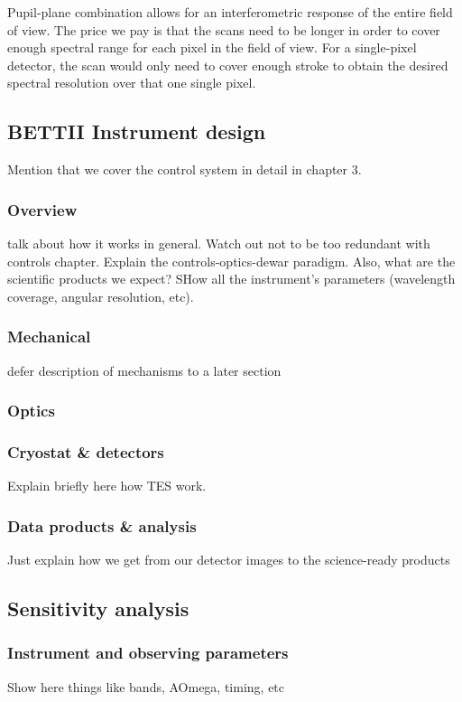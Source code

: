 Pupil-plane combination allows for an interferometric response of the entire field of view. The price we pay is that the \OPD scans need to be longer in order to cover enough spectral range for each pixel in the field of view. For a single-pixel detector, the \OPD scan would only need to cover enough stroke to obtain the desired spectral resolution over that one single pixel.


\subsection{BETTII Instrument design}

Mention that we cover the control system in detail in chapter 3.

\subsubsection{Overview}
talk about how it works in general. Watch out not to be too redundant with controls chapter. Explain the controls-optics-dewar paradigm. Also, what are the scientific products we expect? SHow all the instrument's parameters (wavelength coverage, angular resolution, etc).

\subsubsection{Mechanical}
defer description of mechanisms to a later section
\subsubsection{Optics}

\subsubsection{Cryostat \& detectors}

Explain briefly here how TES work.

\subsubsection{Data products \& analysis}
Just explain how we get from our detector images to the science-ready products

\subsection{Sensitivity analysis}

\subsubsection{Instrument and observing parameters}
Show here things like bands, AOmega, timing, etc
